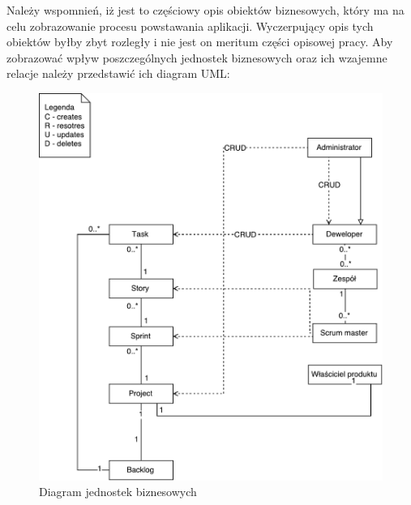 Należy wspomnień, iż jest to częściowy opis obiektów biznesowych, który ma na celu zobrazowanie procesu powstawania aplikacji. Wyczerpujący opis tych obiektów byłby zbyt rozległy i nie jest on meritum części opisowej pracy. Aby zobrazować wpływ poszczególnych jednostek biznesowych oraz ich wzajemne relacje należy przedstawić ich diagram UML:
\begin{figure}[h!]
	\centering
	\includegraphics[width=15cm]{rysunki/diaguml.pdf}	
	\caption{Diagram jednostek biznesowych}
	\label{fig:diaguml}
\end{figure}

